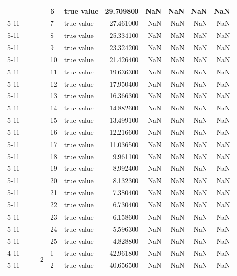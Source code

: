 \begin{tabular}{llllllrrrrr}
 &  &  &  & 6 & true value & 29.709800 & NaN & NaN & NaN & NaN \\
\cline{5-11}
 &  &  &  & 7 & true value & 27.461000 & NaN & NaN & NaN & NaN \\
\cline{5-11}
 &  &  &  & 8 & true value & 25.334100 & NaN & NaN & NaN & NaN \\
\cline{5-11}
 &  &  &  & 9 & true value & 23.324200 & NaN & NaN & NaN & NaN \\
\cline{5-11}
 &  &  &  & 10 & true value & 21.426400 & NaN & NaN & NaN & NaN \\
\cline{5-11}
 &  &  &  & 11 & true value & 19.636300 & NaN & NaN & NaN & NaN \\
\cline{5-11}
 &  &  &  & 12 & true value & 17.950400 & NaN & NaN & NaN & NaN \\
\cline{5-11}
 &  &  &  & 13 & true value & 16.366300 & NaN & NaN & NaN & NaN \\
\cline{5-11}
 &  &  &  & 14 & true value & 14.882600 & NaN & NaN & NaN & NaN \\
\cline{5-11}
 &  &  &  & 15 & true value & 13.499100 & NaN & NaN & NaN & NaN \\
\cline{5-11}
 &  &  &  & 16 & true value & 12.216600 & NaN & NaN & NaN & NaN \\
\cline{5-11}
 &  &  &  & 17 & true value & 11.036500 & NaN & NaN & NaN & NaN \\
\cline{5-11}
 &  &  &  & 18 & true value & 9.961100 & NaN & NaN & NaN & NaN \\
\cline{5-11}
 &  &  &  & 19 & true value & 8.992400 & NaN & NaN & NaN & NaN \\
\cline{5-11}
 &  &  &  & 20 & true value & 8.132300 & NaN & NaN & NaN & NaN \\
\cline{5-11}
 &  &  &  & 21 & true value & 7.380400 & NaN & NaN & NaN & NaN \\
\cline{5-11}
 &  &  &  & 22 & true value & 6.730400 & NaN & NaN & NaN & NaN \\
\cline{5-11}
 &  &  &  & 23 & true value & 6.158600 & NaN & NaN & NaN & NaN \\
\cline{5-11}
 &  &  &  & 24 & true value & 5.596300 & NaN & NaN & NaN & NaN \\
\cline{5-11}
 &  &  &  & 25 & true value & 4.828800 & NaN & NaN & NaN & NaN \\
\cline{4-11} \cline{5-11}
 &  &  & \multirow[t]{25}{*}{2} & 1 & true value & 42.961800 & NaN & NaN & NaN & NaN \\
\cline{5-11}
 &  &  &  & 2 & true value & 40.656500 & NaN & NaN & NaN & NaN \\

\end{tabular}
